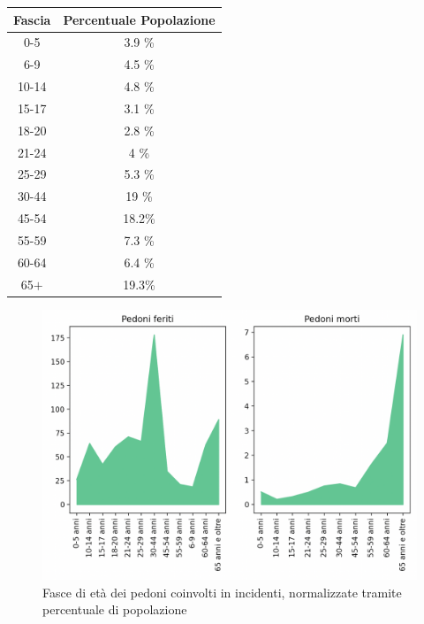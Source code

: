 \documentclass[a4paper]{report}
\begin{document}
\begin{center}
    \def\arraystretch{1.5}%
    \begin{tabular}{ |c|c| } 
    \hline
    Fascia & Percentuale Popolazione \\ 
    \hline
    \rowcolor{TableGray}
    0-5     & 3.9 \% \\ 
    6-9     & 4.5 \% \\
    \rowcolor{TableGray}
    10-14   & 4.8 \% \\
    15-17   & 3.1 \% \\
    \rowcolor{TableGray}
    18-20   & 2.8 \% \\ 
    21-24   & 4   \% \\
    \rowcolor{TableGray}
    25-29   & 5.3 \% \\
    30-44   & 19  \% \\
    \rowcolor{TableGray}
    45-54   & 18.2\% \\ 
    55-59   & 7.3 \% \\
    \rowcolor{TableGray}
    60-64   & 6.4 \% \\
    65$+$   & 19.3\% \\
    \hline
    \end{tabular}
\end{center}


\begin{figure}
    \includegraphics[width=\linewidth]{../src/incidenti/incidenti_senza_coords/pedoni/eta_pedoni_norm.png}
    \caption{Fasce di età dei pedoni coinvolti in incidenti, normalizzate tramite percentuale di popolazione}
    \label{fig:eta-pedoni-norm}
\end{figure}
\end{document}
